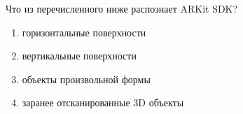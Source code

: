 
Что из перечисленного ниже распознает ARKit SDK?

\begin{enumerate}
    \item горизонтальные поверхности
    \item вертикальные поверхности
    \item объекты произвольной формы
    \item заранее отсканированные 3D объекты
\end{enumerate}

